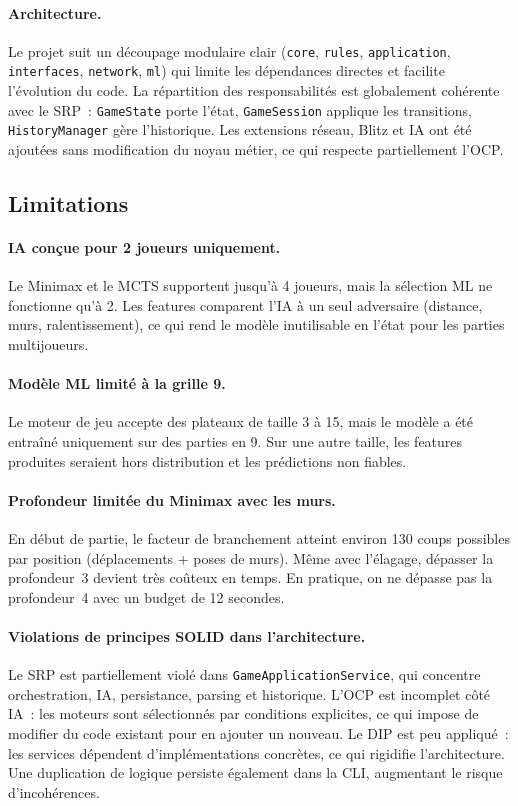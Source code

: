 \documentclass[a4paper]{article}
\begin{document}
\paragraph{Architecture.}
Le projet suit un découpage modulaire clair (\texttt{core}, \texttt{rules},
\texttt{application}, \texttt{interfaces}, \texttt{network}, \texttt{ml}) qui
limite les dépendances directes et facilite l’évolution du code. La répartition
des responsabilités est globalement cohérente avec le SRP~: \texttt{GameState}
porte l’état, \texttt{GameSession} applique les transitions,
\texttt{HistoryManager} gère l’historique. Les extensions réseau, Blitz et IA
ont été ajoutées sans modification du noyau métier, ce qui respecte partiellement
l’OCP.

\subsection*{Limitations}

\paragraph{IA conçue pour 2 joueurs uniquement.}
Le Minimax et le MCTS supportent jusqu’à 4 joueurs, mais la sélection ML ne
fonctionne qu’à 2. Les features comparent l’IA à un seul adversaire (distance,
murs, ralentissement), ce qui rend le modèle inutilisable en l’état pour les
parties multijoueurs.

\paragraph{Modèle ML limité à la grille 9.}
Le moteur de jeu accepte des plateaux de taille 3 à 15, mais le modèle a été
entraîné uniquement sur des parties en 9. Sur une autre taille, les
features produites seraient hors distribution et les prédictions non fiables.

\paragraph{Profondeur limitée du Minimax avec les murs.}
En début de partie, le facteur de branchement atteint environ 130 coups
possibles par position (déplacements + poses de murs). Même avec l’élagage,
dépasser la profondeur~3 devient très coûteux en temps. En pratique, on ne
dépasse pas la profondeur~4 avec un budget de 12 secondes.

\paragraph{Violations de principes SOLID dans l’architecture.}
Le SRP est partiellement violé dans \texttt{GameApplicationService}, qui
concentre orchestration, IA, persistance, parsing et historique. L’OCP est
incomplet côté IA~: les moteurs sont sélectionnés par conditions explicites,
ce qui impose de modifier du code existant pour en ajouter un nouveau. Le DIP
est peu appliqué~: les services dépendent d’implémentations concrètes, ce qui
rigidifie l’architecture. Une duplication de logique persiste également dans
la CLI, augmentant le risque d’incohérences.
\end{document}
